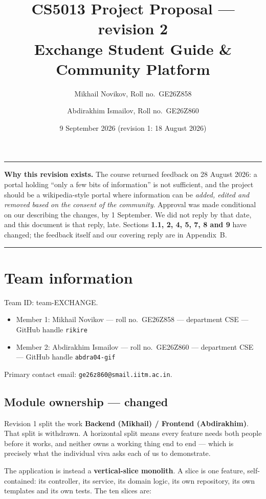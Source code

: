 \documentclass[11pt]{article}
\title{\vspace{-2em}CS5013 Project Proposal --- revision 2\\[0.3em]
\large Exchange Student Guide \& Community Platform}
\author{Mikhail Novikov, Roll no.\ GE26Z858 \and Abdirakhim Ismailov, Roll no.\ GE26Z860}
\date{9 September 2026 \quad (revision 1: 18 August 2026)}
\begin{document}
\maketitle

\vspace{-1em}
\noindent\rule{\textwidth}{0.4pt}

\textbf{Why this revision exists.} The course returned feedback on 28 August 2026: a portal holding
``only a few bits of information'' is not sufficient, and the project should be a wikipedia-style
portal where information can be \emph{added, edited and removed based on the consent of the
community}. Approval was made conditional on our describing the changes, by 1 September. We did not
reply by that date, and this document is that reply, late. Sections \textbf{1.1, 2, 4, 5, 7, 8 and
9} have changed; the feedback itself and our covering reply are in Appendix~B.

\noindent\rule{\textwidth}{0.4pt}

\section{Team information}

Team ID: team-EXCHANGE.

\begin{itemize}
  \item Member 1: Mikhail Novikov --- roll no.\ GE26Z858 --- department CSE --- GitHub handle \texttt{rikire}
  \item Member 2: Abdirakhim Ismailov --- roll no.\ GE26Z860 --- department CSE --- GitHub handle \texttt{abdra04-gif}
\end{itemize}

Primary contact email: \texttt{ge26z860@smail.iitm.ac.in}.

\subsection{Module ownership --- changed}

Revision 1 split the work \textbf{Backend (Mikhail) / Frontend (Abdirakhim)}. That split is
withdrawn. A horizontal split means every feature needs both people before it works, and neither
owns a working thing end to end --- which is precisely what the individual viva asks each of us to
demonstrate.

The application is instead a \textbf{vertical-slice monolith}. A slice is one feature,
self-contained: its controller, its service, its domain logic, its own repository, its own templates
and its own tests. The ten slices are:
\end{document}
